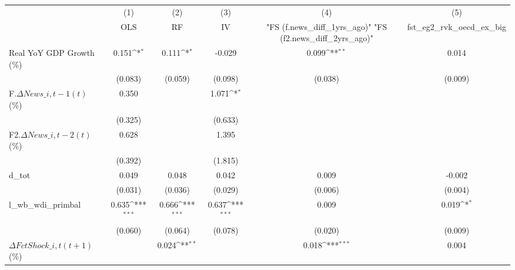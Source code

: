 {
\def\sym#1{\ifmmode^{#1}\else\(^{#1}\)\fi}
\begin{tabular}{l*{5}{c}}
\toprule
                    &\multicolumn{1}{c}{(1)}&\multicolumn{1}{c}{(2)}&\multicolumn{1}{c}{(3)}&\multicolumn{1}{c}{(4)}&\multicolumn{1}{c}{(5)}\\
                    &\multicolumn{1}{c}{OLS}&\multicolumn{1}{c}{RF}&\multicolumn{1}{c}{IV}&\multicolumn{1}{c}{ "FS (f.news\_diff\_1yrs\_ago)"  "FS (f2.news\_diff\_2yrs\_ago)" }&\multicolumn{1}{c}{fst\_eg2\_rvk\_oecd\_ex\_big}\\
\midrule
Real YoY GDP Growth (\%)&       0.151\sym{*}  &       0.111\sym{*}  &      -0.029         &       0.099\sym{**} &       0.014         \\
                    &     (0.083)         &     (0.059)         &     (0.098)         &     (0.038)         &     (0.009)         \\
\addlinespace
F.$ \Delta News\_{i,t-1}(t)$ (\%)&       0.350         &                     &       1.071\sym{*}  &                     &                     \\
                    &     (0.325)         &                     &     (0.633)         &                     &                     \\
\addlinespace
F2.$ \Delta News\_{i,t-2}(t)$ (\%)&       0.628         &                     &       1.395         &                     &                     \\
                    &     (0.392)         &                     &     (1.815)         &                     &                     \\
\addlinespace
d\_tot               &       0.049         &       0.048         &       0.042         &       0.009         &      -0.002         \\
                    &     (0.031)         &     (0.036)         &     (0.029)         &     (0.006)         &     (0.004)         \\
\addlinespace
l\_wb\_wdi\_primbal    &       0.635\sym{***}&       0.666\sym{***}&       0.637\sym{***}&       0.009         &       0.019\sym{*}  \\
                    &     (0.060)         &     (0.064)         &     (0.078)         &     (0.020)         &     (0.009)         \\
\addlinespace
$ \Delta FctShock\_{i,t}(t+1)$ (\%)&                     &       0.024\sym{**} &                     &       0.018\sym{***}&       0.004         \\

\end{tabular}}
